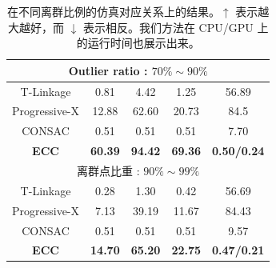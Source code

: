 \begin{table}[ht]
{\begin{tabular}{ccccc}
            \multicolumn{5}{c}{Outlier ratio : $70\%\sim90\%$} \\
            \hline
            T-Linkage & 0.81 & 4.42 & 1.25 & 56.89 \\
            Progressive-X & 12.88 & 62.60 & 20.73 & 84.5 \\
            CONSAC & 0.51 & 0.51 & 0.51 & 7.70  \\
            \textbf{ECC} & \textbf{60.39} & \textbf{94.42} & \textbf{69.36} &\textbf{0.50/0.24}\\
    
            \hline
            \multicolumn{5}{c}{离群点比重 : $90\%\sim99\%$} \\
            \hline
            T-Linkage & 0.28 & 1.30 & 0.42 & 56.69 \\
            Progressive-X & 7.13 & 39.19 & 11.67 & 84.43\\
            CONSAC & 0.51 & 0.51 & 0.51 & 9.57  \\
            \textbf{ECC} & \textbf{14.70} & \textbf{65.20} & \textbf{22.75} & \textbf{0.47/0.21} \\ %
            \bottomrule
    
        \end{tabular}
        }
        \caption{在不同离群比例的仿真对应关系上的结果。$\uparrow$ 表示越大越好，而 $\downarrow$ 表示相反。我们方法在 CPU/GPU 上的运行时间也展示出来。}
        \label{tab:mm}
\end{table}

